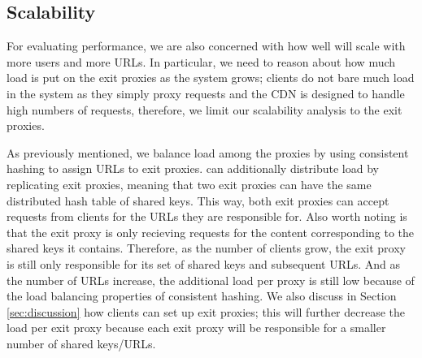 
\subsection{Scalability}
\label{sec:scalability}
For evaluating performance, we are also concerned with how well \system{} will scale with more users 
and more URLs.  In particular, we need to reason about how much load is put on the exit proxies as the 
system grows; clients do not bare much load in the system as they simply proxy requests and the CDN is designed 
to handle high numbers of requests, therefore, we limit our scalability analysis to the exit proxies.  

As previously mentioned, we balance load among the proxies by using consistent hashing to assign URLs to 
exit proxies.  \system{} can additionally distribute load by replicating exit proxies, meaning that two exit proxies can 
have the same distributed hash table of shared keys.  This way, both exit proxies can accept requests from clients for 
the URLs they are responsible for.  Also worth noting is that the exit proxy is only recieving requests for the content 
corresponding to the shared keys it contains.  Therefore, as the number of clients grow, the exit proxy is still only responsible 
for its set of shared keys and subsequent URLs.  And as the number of URLs increase, the additional load per proxy is 
still low because of the load balancing properties of consistent hashing.  We also discuss in Section \ref{sec:discussion} how 
clients can set up exit proxies; this will further decrease the load per exit proxy because each exit proxy will be responsible 
for a smaller number of shared keys/URLs.
